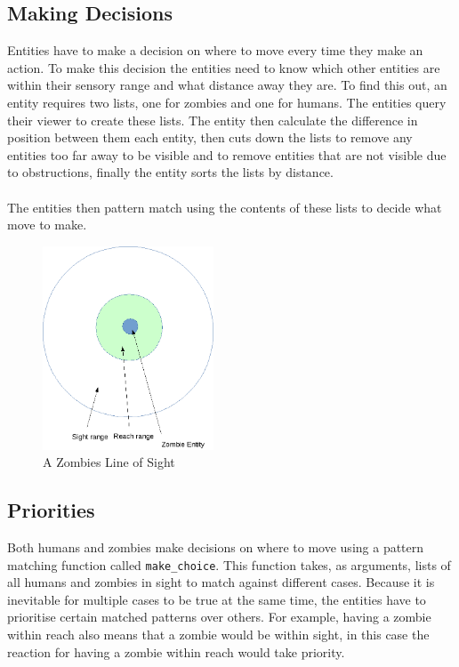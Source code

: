 \documentclass[10pt, a4paper, conference, compsocconf]{IEEEtran}
\begin{document}
\subsection{Making Decisions \label{desicions}}
Entities have to make a decision on where to move every time they make an action. To make this decision the entities need to know which other entities are within their sensory range and what distance away they are. To find this out, an entity requires two lists, one for zombies and one for humans. The entities query their viewer to create these lists. The entity then calculate the difference in position between them each entity, then cuts down the lists to remove any entities too far away to be visible and to remove entities that are not visible due to obstructions, finally the entity sorts the lists by distance.\\
\\
The entities then pattern match using the contents of these lists to decide what move to make.\\

\begin{figure}[h]
  \centering
  \includegraphics[width=2in]{../img/zombie_range.png}
\caption{A Zombies Line of Sight}
    \label{fig:zombie_los}
\end{figure}

\subsection{Priorities \label{priorities}}
Both humans and zombies make decisions on where to move using a pattern matching function called \verb+make_choice+. This function takes, as arguments, lists of all humans and zombies in sight to match against different cases. Because it is inevitable for multiple cases to be true at the same time, the entities have to prioritise certain matched patterns over others. For example, having a zombie within reach also means that a zombie would be within sight, in this case the reaction for having a zombie within reach would take priority.\\
\end{document}

